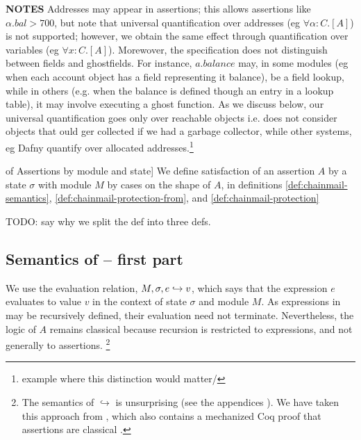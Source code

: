 \noindent
\textbf{NOTES}  Addresses may appear in assertions; this allows  assertions like $\alpha.bal > 700$, but note that universal quantification over addresses  (eg $\forall \alpha:C.[A]$) is not supported; however, we obtain the same effect through quantification over variables (eg  $\forall x:C.[A]$).  
Morewover, the specification does not distinguish between fields and ghostfields. For instance, $a.balance$ may, in some modules (eg when each account object has a field representing it balance), be a field lookup, while in others (e.g. when the balance is defined though an entry in a lookup table),  it may involve executing a ghost function. 
As we discuss below,  our universal quantification goes only over reachable objects i.e. does not consider objects that ould ger collected if we had a garbage collector, while other systems, eg Dafny quantify over allocated addresses.\footnote{example where this distinction would matter/}

\begin{definition} 
\label{def:chainmail-semantics-all}
of Assertions by module and  state] 
\label{def:chainmail-semantics}
We define satisfaction of an assertion $A$ by a %
state $\sigma$ with 
 module $M$ by cases on the shape of $A$, in definitions \ref{def:chainmail-semantics}, \ref{def:chainmail-protection-from}, and 
 \ref{def:chainmail-protection}
\end{definition}

TODO: say why we split the def into three defs. 

\subsection{Semantics of \AssertLang -- first part}
\label{sect:semantics:assert:standard}

We   use the evaluation relation, $M, \sigma, e \hookrightarrow v$,
which says that the expression $e$ evaluates
to value $v$ in the context of state $\sigma$ and module $M$.
As expressions in \LangOO may be recursively defined, their evaluation 
need not   %
 terminate. Nevertheless, the logic of $A$ remains classical because recursion is restricted
to expressions, and not generally to assertions.
\footnote{
The semantics of $\hookrightarrow$ {is} unsurprising 
(see {the appendices %
\cite{necessityFull}).}
We have taken this approach from , which also contains a mechanized Coq proof that assertions are classical \cite{coqFASE}. } %



